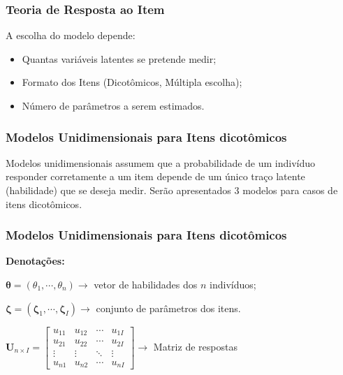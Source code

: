 \documentclass{beamer}
\begin{document}
	\begin{frame}
		
		\frametitle{Teoria de Resposta ao Item}
		
		A escolha do modelo depende: \newline
		
	
		\begin{itemize}
			\item<1-> Quantas variáveis latentes se pretende medir;
			\item<1-> Formato dos Itens (Dicotômicos, Múltipla escolha);
			\item<1-> Número de parâmetros a serem estimados.
		    
		\end{itemize}
	\end{frame}

	
	\begin{frame}
		
		\frametitle{Modelos Unidimensionais para Itens dicotômicos}
		
		Modelos unidimensionais assumem que a probabilidade de um indivíduo responder corretamente a um item depende de um único traço latente (habilidade) que se deseja medir. Serão apresentados 3 modelos para casos de itens dicotômicos. 
		
		

	\end{frame}
	
	\begin{frame}
		
		\frametitle{Modelos Unidimensionais para Itens dicotômicos }
		
		\begin{center}
			\textbf{Denotações:}
		\end{center}
		
		$ \boldsymbol{\theta} = (\theta_1, \cdots, \theta_n) \rightarrow $  vetor de habilidades dos $n$ indivíduos; \newline
		
		$ \boldsymbol{\zeta} = (\boldsymbol{\zeta}_1, \cdots, \boldsymbol{\zeta}_I) \rightarrow $ conjunto de parâmetros dos itens.\newline
		
		$ \textbf{U}_{n\times I} =  
		\begin{bmatrix}
			u_{11} & u_{12} & \cdots & u_{1I} \\
			u_{21} & u_{22} & \cdots & u_{2I} \\
			\vdots & \vdots & \ddots & \vdots\\
			u_{n1} & u_{n2} & \cdots & u_{nI}
		\end{bmatrix} \rightarrow
		$ Matriz de respostas
		
		
		
	\end{frame}
	
\end{document}
